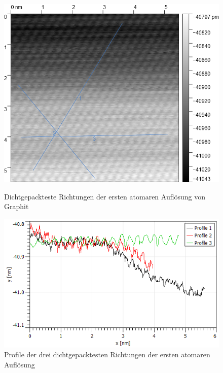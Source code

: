 \documentclass[12pt,a4paper]{scrartcl}
\numberwithin{equation}{section} %
\begin{document}
\begin{figure}[h!]
	\centering
	\begin{minipage}[t]{0.4\textwidth}
		\centering
		\includegraphics[width=\textwidth]{../media/B2.5/Atoms1_with_profileLines.png}
		\caption{Dichtgepackteste Richtungen der ersten atomaren Auflösung von Graphit}
		\label{abb:hopg_with_profile_1}
	\end{minipage}
	\begin{minipage}[t]{0.5\textwidth}
		\centering
		\includegraphics[width=\textwidth]{../media/B2.5/profilePlot_area1.png}
		\caption{Profile der drei dichtgepacktesten Richtungen der ersten atomaren Auflösung}
		\label{abb:hopg_profile_1}
	\end{minipage}
	\vspace{12pt}
	

\end{figure}
\end{document}
